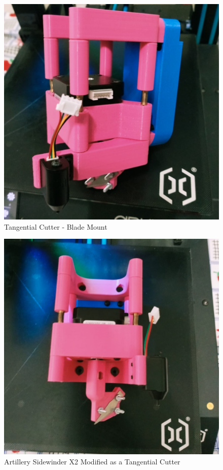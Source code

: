 \begin{figure}[h!tb]
\centering
\includegraphics[scale=0.30]{tc-3.jpg}
\caption{Tangential Cutter - Blade Mount}
\label{fig:label4}
\end{figure}



\begin{figure}[h!tb]
\centering
\includegraphics[scale=0.30]{tc-4.jpg}
\caption{Artillery Sidewinder X2 Modified as a Tangential Cutter}
\label{fig:label5}
\end{figure} 